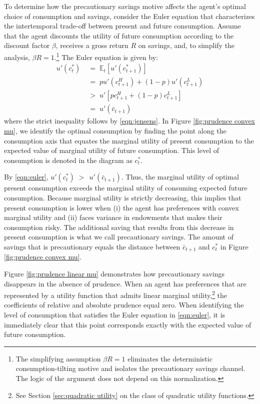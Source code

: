 \documentclass[11pt]{article}
\begin{document}
To determine how the precautionary savings motive affects the agent's optimal choice of consumption and savings, consider the Euler equation that characterizes the intertemporal trade-off between present and future consumption. Assume that the agent discounts the utility of future consumption according to the discount factor $\beta$, receives a gross return $R$ on savings, and, to simplify the analysis, $\beta R = 1$.\footnote{The simplifying assumption $\beta R = 1$ eliminates the deterministic consumption-tilting motive and isolates the precautionary savings channel. The logic of the argument does not depend on this normalization.} The Euler equation is given by:
\begin{align}
    u'(c_t^*) &\;=\; \mathbb{E}_t\!\left[u'(c_{t+1}^*)\right] \label{eqn:euler} \\
    &\;=\; p u'(c_{t+1}^H) + (1-p) u'(c_{t+1}^L) \nonumber \\
    &\;>\; u'\left[p c_{t+1}^H + (1-p)c_{t+1}^L\right] \nonumber \\
    &\;=\; u'(\bar c_{t+1}) \nonumber
\end{align}
where the strict inequality follows by \eqref{eqn:jensens}. In Figure \ref{fig:prudence convex mu}, we identify the optimal consumption by finding the point along the consumption axis that equates the marginal utility of present consumption to the expected value of marginal utility of future consumption. This level of consumption is denoted in the diagram as $c_t^*$. 

By \eqref{eqn:euler}, $u'(c_t^*) \;>\; \,u'(\bar c_{t+1})$. Thus, the marginal utility of optimal present consumption exceeds the marginal utility of consuming expected future consumption. Because marginal utility is strictly decreasing, this implies that present consumption is lower when (i) the agent has preferences with convex marginal utility and (ii) faces variance in endowments that makes their consumption risky. The additional saving that results from this decrease in present consumption is what we call precautionary savings. The amount of savings that is precautionary equals the distance between $\bar{c}_{t+1}$ and $c_t^*$ in Figure \ref{fig:prudence convex mu}.

Figure \ref{fig:prudence linear mu} demonstrates how precautionary savings disappears in the absence of prudence. When an agent has preferences that are represented by a utility function that admits linear marginal utility,\footnote{See Section \ref{sec:quadratic utility} on the class of quadratic utility functions.} the coefficients of relative and absolute prudence equal zero. When identifying the level of consumption that satisfies the Euler equation in \eqref{eqn:euler}, it is immediately clear that this point corresponds exactly with the expected value of future consumption.
\end{document}
